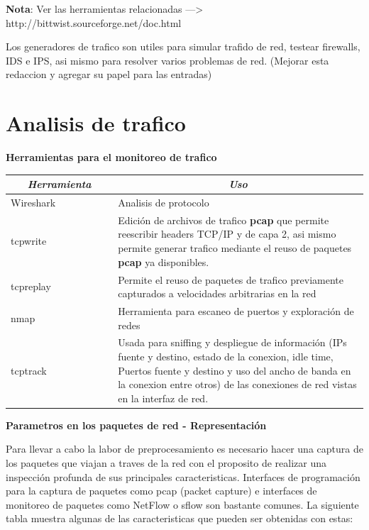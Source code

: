 \documentclass[12pt]{article}
\begin{document}
\textbf{Nota}: Ver las herramientas relacionadas ---> http://bittwist.sourceforge.net/doc.html 


\FloatBarrier

Los generadores de trafico son utiles para simular trafido de red, testear firewalls, IDS e IPS, asi mismo para resolver varios problemas de red. (Mejorar esta redaccion y agregar su papel para las entradas)



\section{Analisis de trafico}

\textbf{Herramientas para el monitoreo de trafico}

\begin{table}[htbp]
\centering
\begin{tabular}{|p{0.3\linewidth}|p{0.7\linewidth}|}
\hline
\multicolumn{1}{|c|}{\textit{\textbf{Herramienta}}} & \multicolumn{1}{c|}{\textit{\textbf{Uso}}} \tabularnewline \hline
Wireshark & Analisis de protocolo  \tabularnewline \hline
tcpwrite & Edición de archivos de trafico \textbf{pcap} que permite reescribir headers TCP/IP y de capa 2, asi mismo permite generar trafico mediante el reuso de paquetes \textbf{pcap} ya disponibles. \tabularnewline \hline
tcpreplay &  Permite el reuso de paquetes de trafico previamente capturados a velocidades arbitrarias en la red\tabularnewline \hline
nmap & Herramienta para escaneo de puertos y exploración de redes \tabularnewline \hline
tcptrack & Usada para sniffing y despliegue de información (IPs fuente y destino, estado de la conexion, idle time, Puertos fuente y destino y uso del ancho de banda en la conexion entre otros) de las conexiones de red vistas en la interfaz de red.   \tabularnewline \hline
\end{tabular}
\end{table}



\textbf{Parametros en los paquetes de red - Representación}


Para llevar a cabo la labor de preprocesamiento es necesario hacer una captura de los paquetes que viajan a traves de la red con el proposito de realizar una inspección profunda de sus principales caracteristicas. Interfaces de programación para la captura de paquetes como pcap (packet capture) e interfaces de monitoreo de paquetes como NetFlow o sflow son bastante comunes. La siguiente tabla muestra algunas de las caracteristicas que pueden ser obtenidas con estas:
\end{document}
